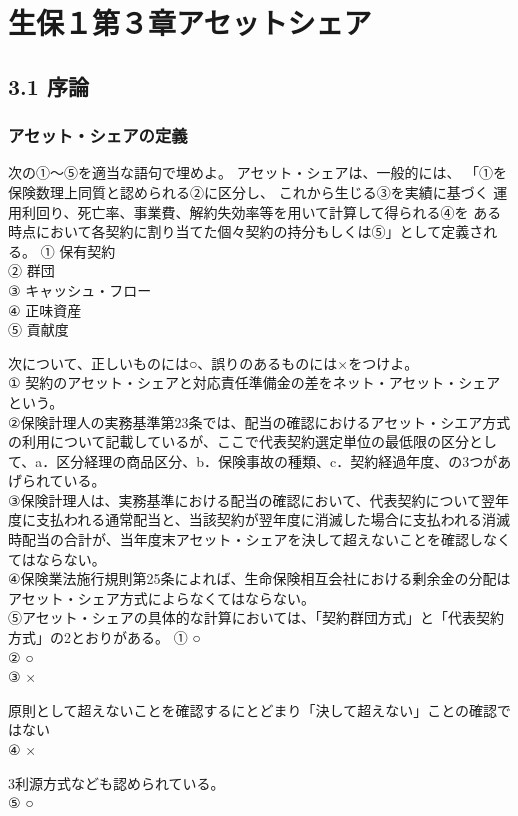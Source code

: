 \documentclass[report,gutter=10mm,fore-edge=10mm,uplatex,dvipdfmx]{jlreq}
\begin{document}
\chapter{生保１第３章アセットシェア}
\section{3.1 序論}
\subsection{アセット・シェアの定義}
次の①～⑤を適当な語句で埋めよ。
アセット・シェアは、一般的には、
「①を保険数理上同質と認められる②に区分し、
これから生じる③を実績に基づく
運用利回り、死亡率、事業費、解約失効率等を用いて計算して得られる④を
ある時点において各契約に割り当てた個々契約の持分もしくは⑤」として定義される。
\answer{}
\noindent
① 保有契約\\
② 群団\\
③ キャッシュ・フロー\\
④ 正味資産\\
⑤ 貢献度

次について、正しいものには○、誤りのあるものには×をつけよ。\\
① 契約のアセット・シェアと対応責任準備金の差をネット・アセット・シェアという。\\
②保険計理人の実務基準第23条では、配当の確認におけるアセット・シエア方式の利用について記載しているが、ここで代表契約選定単位の最低限の区分として、a．区分経理の商品区分、b．保険事故の種類、c．契約経過年度、の3つがあげられている。\\
③保険計理人は、実務基準における配当の確認において、代表契約について翌年度に支払われる通常配当と、当該契約が翌年度に消滅した場合に支払われる消滅時配当の合計が、当年度末アセット・シェアを決して超えないことを確認しなくてはならない。\\
④保険業法施行規則第25条によれば、生命保険相互会社における剰余金の分配はアセット・シェア方式によらなくてはならない。\\
⑤アセット・シェアの具体的な計算においては、「契約群団方式」と「代表契約方式」の2とおりがある。
\answer{}
\noindent
① ○\\
② ○\\
③ ×

原則として超えないことを確認するにとどまり「決して超えない」ことの確認ではない\\
④ ×

3利源方式なども認められている。\\
⑤ ○
\end{document}
